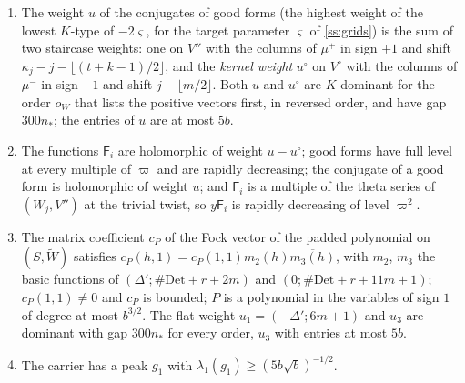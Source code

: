 \begin{lemma}\label{lem:weights-Wj}
\begin{enumerate}[label=\textup{(\alph*)}]
\item The weight $u$ of the conjugates of good forms (the highest weight of the lowest $K$-type of $-2\varsigma$, for the target parameter $\varsigma$ of \cref{ss:grids}) is the sum of two staircase weights: one on $V''$ with the columns of $\mu^+$ in sign $+1$ and shift $\kappa_j-j-\lfloor(t+k-1)/2\rfloor$, and the
\emph{kernel weight} $u^\circ$ on $V^\circ$ with the columns of $\mu^-$ in sign $-1$ and shift $j-\lfloor m/2\rfloor$. Both $u$ and $u^\circ$ are $K$-dominant for the order $o_W$ that lists the positive vectors first, in reversed order, and have gap $300n_*$; the
entries of $u$ are at most $5b$.
\item The functions $\mathsf F_i$ are holomorphic of weight $u-u^\circ$; good forms have full level at every multiple of $\varpi$ and are rapidly decreasing; the conjugate of a good form is holomorphic of weight $u$; and $\mathsf F_i$ is a multiple of the
theta series of $(W_j,V'')$ at the trivial twist, so $y\mathsf F_i$ is rapidly decreasing of level $\varpi^2$.
\item The matrix coefficient $c_P$ of the Fock vector of the padded polynomial on $(S,\tilde W)$ satisfies $c_P(h,1)=c_P(1,1)m_2(h)\overline{m_3(h)}$, with $m_2$, $m_3$ the basic functions of $(\Delta';\#\mathrm{Det}+r+2m)$ and $(0;\#\mathrm{Det}+r+11m+1)$; $c_P(1,1)\ne0$ and $c_P$ is bounded;
$P$ is a polynomial in the variables of sign $1$ of degree at most $b^{3/2}$. The flat weight $u_1=(-\Delta';6m+1)$ and $u_3$ are dominant with gap $300n_*$ for every order, $u_3$ with entries at most $5b$.
\item The carrier has a peak $g_1$ with $\lambda_1(g_1)\ge(5b\sqrt b)^{-1/2}$.
\end{enumerate}
\end{lemma}

